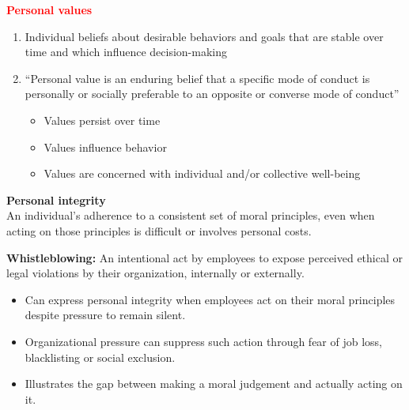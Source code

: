 \documentclass{article}
\DeclareRobustCommand{\k}[1]{\textcolor{red}{#1}}
\begin{document}
\vspace{.5cm}
\k{\textbf{Personal values}}
\begin{enumerate}
    \item Individual beliefs about desirable behaviors and goals that are stable over time and which influence decision-making
    \item ``Personal value is an enduring belief that a specific mode of conduct is personally or socially preferable to an opposite or converse mode of conduct''
    \begin{itemize}[label=$\to$]
        \item Values persist over time
        \item Values influence behavior
        \item Values are concerned with individual and/or collective well-being
    \end{itemize}
\end{enumerate}

\textbf{Personal integrity}\\
An individual's adherence to a consistent set of moral principles, even when
acting on those principles is difficult or involves personal costs.

\textbf{Whistleblowing:} An intentional act by employees to expose
perceived ethical or legal violations by their organization, internally or externally.
\begin{itemize}[label=$\to$]
    \item Can express personal integrity when employees act on their moral
    principles despite pressure to remain silent.
    \item Organizational pressure can suppress such action through fear of
    job loss, blacklisting or social exclusion.
    \item Illustrates the gap between making a moral judgement and actually
    acting on it.
\end{itemize}

\newpage
\end{document}
